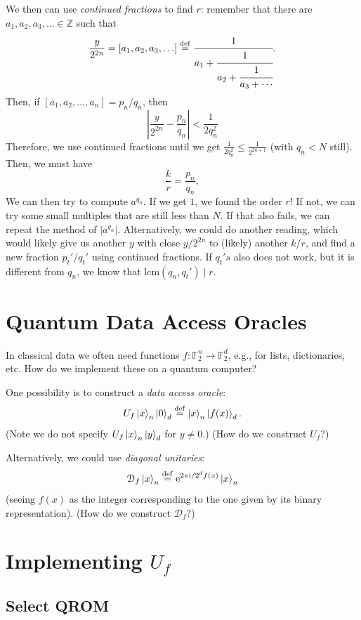 \documentclass[12pt]{amsart}
\theoremstyle{plain}
\theoremstyle{definition}
\theoremstyle{remark}
\newcommand{\F}{\mathbb{F}}
\newcommand{\Z}{\mathbb{Z}}
\newcommand{\me}{\mathrm{e}}
\newcommand{\mi}{\mathrm{i}}
\newcommand{\idef}{\overset{{\rm def}}{=}}
\newcommand{\abs}[1]{\left| #1 \right|}
\begin{document}
We then can use \emph{continued fractions} to find $r$: remember that there are $a_1, a_2, a_3, \ldots \in \Z$ such that
\[
  \frac{y}{2^{2n}} = [a_1, a_2, a_3, \ldots] \idef  \cfrac{1}{a_1 + \cfrac{1}{a_2 + \cfrac{1}{a_3 + \cdots}}}.
\]
Then, if $[a_1, a_2, \ldots, a_n] = p_n/q_n$, then
\[
  \abs{\frac{y}{2^{2n}} - \frac{p_n}{q_n}} < \frac{1}{2q_n^2}
\]
Therefore, we use continued fractions until we get $\frac{1}{2q_n^2} \leq \frac{1}{2^{2n+1}}$ (with $q_n < N$ still).  Then, we must have
\[
  \frac{k}{r} = \frac{p_n}{q_n},
\]
We can then try to compute $a^{q_n}$.  If we get $1$, we found the order $r$!  If not, we can try some small multiples that are still less than $N$.  If that also fails, we can repeat the method of $\abs{a^{q_n}}$.  Alternatively, we could do another reading, which would likely give us another $y$ with close $y/2^{2n}$ to (likely) another $k/r$, and find a new fraction $p_t'/q_t'$ using continued fractions.  If $q_t's$ also does not work, but it is different from $q_n$, we know that $\mathrm{lcm}(q_n, q_t') \mid r$.


\section{Quantum Data Access Oracles}

In classical data we often need functions $f : \F_2^n \to \F_2^d$, e.g., for lists, dictionaries, etc.  How do we implement these on a quantum computer?

One possibility is to construct a \emph{data access oracle}:
\[
  U_f \ket{x}_n \ket{0}_d \idef \ket{x}_n \ket{f(x)}_d.
\]
(Note we do not specify $U_f \ket{x}_n \ket{y}_d$ for $y \neq 0$.)  (How do we construct $U_f$?)

Alternatively, we could use \emph{diagonal unitaries}:
\[
  \mathcal{D}_f \ket{x}_n \idef \me^{2 \pi \mi/2^d f(x)} \ket{x}_n
\]
(seeing $f(x)$ as the integer corresponding to the one given by its binary representation).  (How do we construct $\mathcal{D}_f$?)


\section{Implementing $U_f$}

\subsection{Select QROM}
\end{document}
